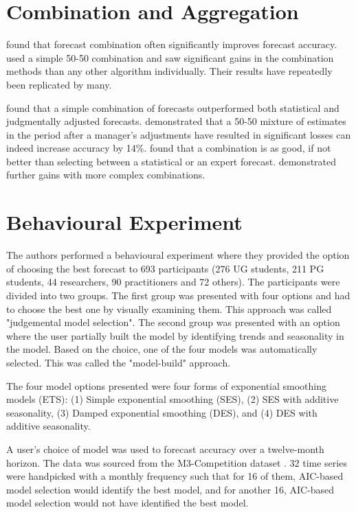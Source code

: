 \documentclass[12pt]{article}
\begin{document}
\section{Combination and Aggregation}

\cite{armstrong2001combining} found that forecast combination often significantly improves forecast accuracy. \cite{blatterberg1990database} used a simple 50-50 combination and saw significant gains in the combination methods than any other algorithm individually. Their results have repeatedly been replicated by many.

\cite{franses2011combining} found that a simple combination of forecasts outperformed both statistical and judgmentally adjusted forecasts. \cite{petropoulos2016big} demonstrated that a 50-50 mixture of estimates in the period after a manager's adjustments have resulted in significant losses can indeed increase accuracy by 14\%. \cite{wang2016select} found that a combination is as good, if not better than selecting between a statistical or an expert forecast. \cite{trapero2013analysis} demonstrated further gains with more complex combinations.


\section{Behavioural Experiment}

The authors performed a behavioural experiment where they provided the option of choosing the best forecast to 693 participants (276 UG students, 211 PG students, 44 researchers, 90 practitioners and 72 others). The participants were divided into two groups. The first group was presented with four options and had to choose the best one by visually examining them. This approach was called "judgemental model selection". The second group was presented with an option where the user partially built the model by identifying trends and seasonality in the model. Based on the choice, one of the four models was automatically selected. This was called the "model-build" approach.

The four model options presented were four forms of exponential smoothing models (ETS): (1) Simple exponential smoothing (SES), (2) SES with additive seasonality, (3) Damped exponential smoothing (DES), and (4) DES with additive seasonality.

A user's choice of model was used to forecast accuracy over a twelve-month horizon. The data was sourced from the M3-Competition dataset \citep{makridakis2000m3}. 32 time series were handpicked with a monthly frequency such that for 16 of them, AIC-based model selection would identify the best model, and for another 16, AIC-based model selection would not have identified the best model.
\end{document}
